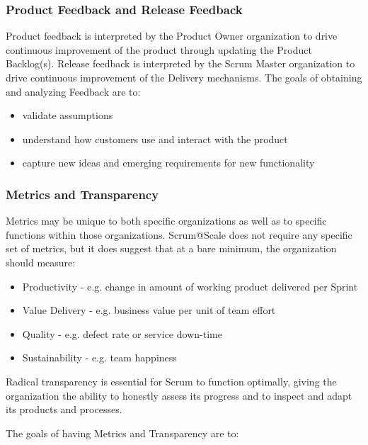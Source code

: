 \documentclass[12pt,a4paper,parskip=full]{scrartcl}
\begin{document}
\subsubsection{Product Feedback and Release
Feedback}\label{product-feedback-and-release-feedback}

Product feedback is interpreted by the Product Owner organization to
drive continuous improvement of the product through updating the Product
Backlog(s). Release feedback is interpreted by the Scrum Master
organization to drive continuous improvement of the Delivery mechanisms.
The goals of obtaining and analyzing Feedback are to:

\begin{itemize}
\itemsep1pt\parskip0pt
\item
  validate assumptions
\item
  understand how customers use and interact with the product
\item
  capture new ideas and emerging requirements for new functionality
\end{itemize}

\subsubsection{Metrics and Transparency}\label{Metrics-and-transparency}

Metrics may be unique to both specific organizations as well as to
specific functions within those organizations. Scrum@Scale does not
require any specific set of metrics, but it does suggest that at a bare
minimum, the organization should measure:

\begin{itemize}
\itemsep1pt\parskip0pt
\item
  Productivity - e.g. change in amount of working product delivered per
  Sprint
\item
  Value Delivery - e.g. business value per unit of team effort
\item
  Quality - e.g. defect rate or service down-time
\item
  Sustainability - e.g. team happiness
\end{itemize}

Radical transparency is essential for Scrum to function optimally,
giving the organization the ability to honestly assess its progress and
to inspect and adapt its products and processes.

The goals of having Metrics and Transparency are to:
\end{document}
